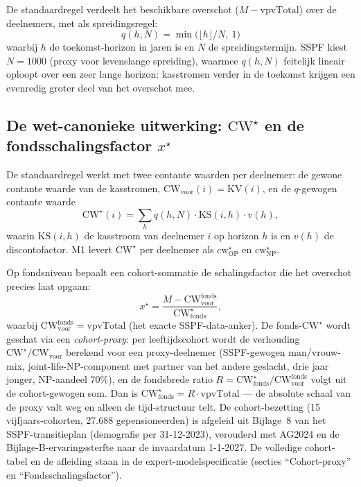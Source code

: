 \documentclass[11pt,a4paper]{article}
\newcommand{\vpvTotal}{\text{vpvTotal}}
\newcommand{\CWvoor}{\text{CW}_{\text{voor}}}
\newcommand{\CWstar}{\text{CW}^{\star}}
\newcommand{\KS}{\text{KS}}
\begin{document}
De standaardregel verdeelt het beschikbare overschot ($M - \vpvTotal$) over de deelnemers, met als spreidingsregel:
\begin{equation}
q(h, N) = \min\bigl(\lfloor h \rfloor / N,\ 1\bigr)
\end{equation}
waarbij $h$ de toekomst-horizon in jaren is en $N$ de spreidingstermijn. SSPF kiest $N = 1000$ (proxy voor levenslange spreiding), waarmee $q(h, N)$ feitelijk lineair oploopt over een zeer lange horizon: kasstromen verder in de toekomst krijgen een evenredig groter deel van het overschot mee.

\subsection{De wet-canonieke uitwerking: $\CWstar$ en de fondsschalingsfactor $x^{\star}$}

De standaardregel werkt met twee contante waarden per deelnemer: de gewone contante waarde van de kasstromen, $\CWvoor(i) = \text{KV}(i)$, en de $q$-gewogen contante waarde
\begin{equation}
\CWstar(i) = \sum_h q(h, N) \cdot \KS(i, h) \cdot v(h),
\end{equation}
waarin $\KS(i,h)$ de kasstroom van deelnemer $i$ op horizon $h$ is en $v(h)$ de discontofactor. M1 levert $\CWstar$ per deelnemer als $\text{cw}^{\star}_{\text{OP}}$ en $\text{cw}^{\star}_{\text{NP}}$.

Op fondsniveau bepaalt een cohort-sommatie de schalingsfactor die het overschot precies laat opgaan:
\begin{equation}
x^{\star} = \frac{M - \text{CW}^{\text{fonds}}_{\text{voor}}}{\text{CW}^{\star}_{\text{fonds}}},
\end{equation}
waarbij $\text{CW}^{\text{fonds}}_{\text{voor}} = \vpvTotal$ (het exacte SSPF-data-anker). De fonds-$\CWstar$ wordt geschat via een \emph{cohort-proxy}: per leeftijdscohort wordt de verhouding $\CWstar/\CWvoor$ berekend voor een proxy-deelnemer (SSPF-gewogen man/vrouw-mix, joint-life-NP-component met partner van het andere geslacht, drie jaar jonger, NP-aandeel 70\%), en de fondsbrede ratio $R = \text{CW}^{\star}_{\text{fonds}}/\text{CW}^{\text{fonds}}_{\text{voor}}$ volgt uit de cohort-gewogen som. Dan is $\text{CW}^{\star}_{\text{fonds}} = R \cdot \vpvTotal$ --- de absolute schaal van de proxy valt weg en alleen de tijd-structuur telt. De cohort-bezetting (15 vijfjaars-cohorten, 27.688 gepensioneerden) is afgeleid uit Bijlage~8 van het SSPF-transitieplan (demografie per 31-12-2023), verouderd met AG2024 en de Bijlage-B-ervaringssterfte naar de invaardatum 1-1-2027. De volledige cohort-tabel en de afleiding staan in de expert-modelspecificatie (secties ``Cohort-proxy'' en ``Fondsschalingsfactor'').
\end{document}
